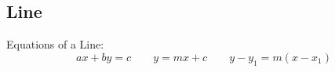\subsection{Line}

Equations of a Line: \\
\hfill \break
$$ax + by = c \quad\quad y = mx + c \quad\quad y - y_1 = m(x - x_1)$$